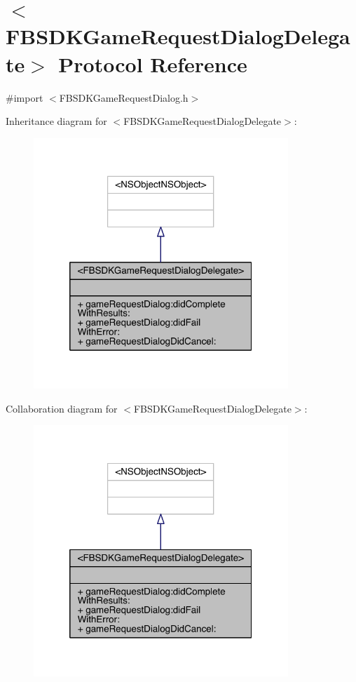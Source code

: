\hypertarget{protocol_f_b_s_d_k_game_request_dialog_delegate-p}{\section{$<$F\-B\-S\-D\-K\-Game\-Request\-Dialog\-Delegate$>$ Protocol Reference}
\label{protocol_f_b_s_d_k_game_request_dialog_delegate-p}
}


{\ttfamily \#import $<$F\-B\-S\-D\-K\-Game\-Request\-Dialog.\-h$>$}



Inheritance diagram for $<$F\-B\-S\-D\-K\-Game\-Request\-Dialog\-Delegate$>$\-:
\nopagebreak
\begin{figure}[H]
\begin{center}
\leavevmode
\includegraphics[width=272pt]{protocol_f_b_s_d_k_game_request_dialog_delegate-p__inherit__graph}
\end{center}
\end{figure}


Collaboration diagram for $<$F\-B\-S\-D\-K\-Game\-Request\-Dialog\-Delegate$>$\-:
\nopagebreak
\begin{figure}[H]
\begin{center}
\leavevmode
\includegraphics[width=272pt]{protocol_f_b_s_d_k_game_request_dialog_delegate-p__coll__graph}
\end{center}
\end{figure}
